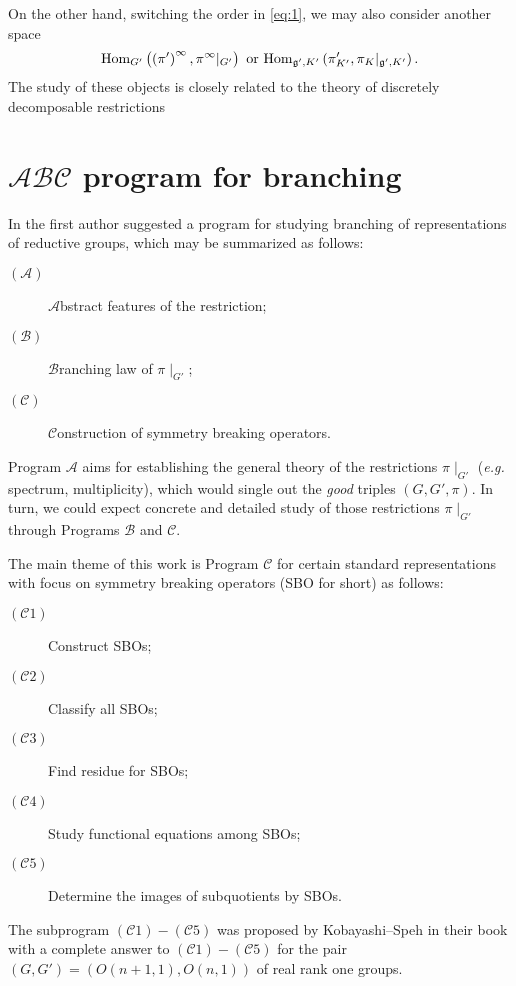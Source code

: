 \documentclass[reqno,12pt]{pja00} %
\newcommand{\Hom}{\mbox{\normalfont Hom}}
\theoremstyle{definition}
\theoremstyle{exampstyle} \newtheorem{examp}[theorem]{Theorem}
\begin{document}
On the other hand, switching the order in \eqref{eq:1}, we may also consider another space
\begin{equation*}
	\Hom_{G'}\left( \left( \pi' \right)^\infty,\pi^\infty\kern-0.1cm\mid_{G'} \right)\mbox{ or }\Hom_{\mathfrak{g}',K'}\left( \pi_{K'}',\pi_{K}\kern-0.1cm\mid_{\mathfrak{g}',K'} \right).
\end{equation*}
The study of these objects is closely related to the theory of discretely decomposable restrictions \cite{kobayashi1998discrete2,kobayashi1998discrete3}

\section{$\mathcal{A}\mathcal{B}\mathcal{C}$ program for branching}

In {\cite{kobayashi2015program}} the first author suggested a program
for studying branching of representations of reductive groups, which may be summarized
as follows:
\begin{description}
  \item[$(\mathcal{A})$] $\mathcal{A}$bstract features of the restriction;
  
  \item[$(\mathcal{B})$] $\mathcal{B}$ranching law of $\pi\!\mid_{G'}$;
  
  \item[$(\mathcal{C})$] $\mathcal{C}$onstruction of symmetry breaking operators.
\end{description}
Program $\mathcal{A}$ aims for establishing the general theory of the restrictions $\pi\!\mid_{G'}$
({\it e.g.} spectrum, multiplicity), which would single out the {\it good} triples $\left( G,G',\pi \right)$. In turn, we could expect concrete and detailed study of those restrictions
$\pi\!\mid_{G'}$ through Programs $\mathcal{B}$ and $\mathcal{C}$.

The main theme of this work is Program ${\mathcal{C}}$ for certain standard
representations with focus on symmetry breaking operators (SBO for short) as follows:
\begin{description}
  \item[$(\mathcal{C}1)$] Construct SBOs;
  \item[$(\mathcal{C}2)$] Classify all SBOs;
  \item[$(\mathcal{C}3)$] Find residue  for SBOs;
  \item[$(\mathcal{C}4)$] Study functional equations among SBOs;
  \item[$(\mathcal{C}5)$] Determine the images of subquotients by SBOs.
\end{description}
The subprogram $(\mathcal{C}1) - (\mathcal{C}5)$ was proposed by
Kobayashi--Speh in their book {\cite{kobayashi2015symmetry}} with
a complete answer to $(\mathcal{C}1) - (\mathcal{C}5)$ for the
pair $(G, G') = (O (n + 1, 1), O (n, 1))$ of real rank one groups.
\end{document}
